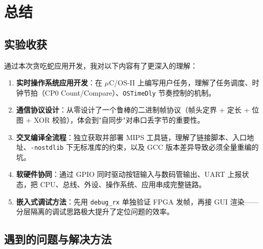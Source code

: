 \section{总结}

\subsection{实验收获}

通过本次贪吃蛇应用开发，我对以下内容有了更深入的理解：

\begin{enumerate}[leftmargin=2em]
    \item \textbf{实时操作系统应用开发}：在 $\mu$C/OS-II 上编写用户任务，理解了任务调度、时钟节拍（CP0 Count/Compare）、\texttt{OSTimeDly} 节奏控制的机制。
    \item \textbf{通信协议设计}：从零设计了一个鲁棒的二进制帧协议（帧头定界 + 定长 + 位图 + XOR 校验），体会到"自同步"对串口丢字节的重要性。
    \item \textbf{交叉编译全流程}：独立获取并部署 MIPS 工具链，理解了链接脚本、入口地址、\texttt{-nostdlib} 下无标准库的约束，以及 GCC 版本差异导致必须全量重编的坑。
    \item \textbf{软硬件协同}：通过 GPIO 同时驱动按钮输入与数码管输出、UART 上报状态，把 CPU、总线、外设、操作系统、应用串成完整链路。
    \item \textbf{嵌入式调试方法}：先用 \texttt{debug\_rx} 单独验证 FPGA 发帧，再接 GUI 渲染——分层隔离的调试思路极大提升了定位问题的效率。
\end{enumerate}

\subsection{遇到的问题与解决方法}

